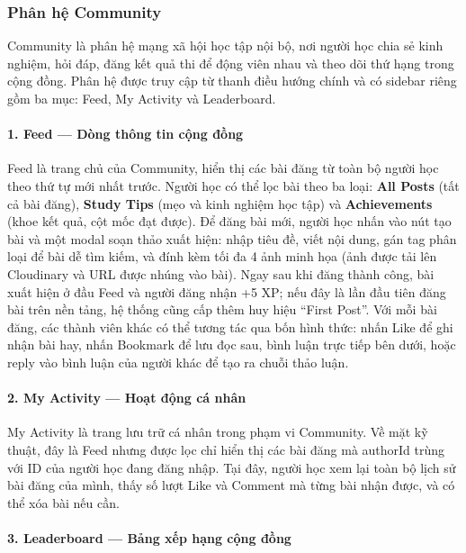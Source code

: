 \subsubsection{Phân hệ Community}

Community là phân hệ mạng xã hội học tập nội bộ, nơi người học chia sẻ kinh nghiệm, hỏi đáp, đăng kết quả thi để động viên nhau và theo dõi thứ hạng trong cộng đồng. Phân hệ được truy cập từ thanh điều hướng chính và có sidebar riêng gồm ba mục: Feed, My Activity và Leaderboard.

\paragraph{1. Feed --- Dòng thông tin cộng đồng}

Feed là trang chủ của Community, hiển thị các bài đăng từ toàn bộ người học theo thứ tự mới nhất trước. Người học có thể lọc bài theo ba loại: \textbf{All Posts} (tất cả bài đăng), \textbf{Study Tips} (mẹo và kinh nghiệm học tập) và \textbf{Achievements} (khoe kết quả, cột mốc đạt được). Để đăng bài mới, người học nhấn vào nút tạo bài và một modal soạn thảo xuất hiện: nhập tiêu đề, viết nội dung, gán tag phân loại để bài dễ tìm kiếm, và đính kèm tối đa 4 ảnh minh họa (ảnh được tải lên Cloudinary và URL được nhúng vào bài). Ngay sau khi đăng thành công, bài xuất hiện ở đầu Feed và người đăng nhận +5 XP; nếu đây là lần đầu tiên đăng bài trên nền tảng, hệ thống cũng cấp thêm huy hiệu ``First Post''. Với mỗi bài đăng, các thành viên khác có thể tương tác qua bốn hình thức: nhấn Like để ghi nhận bài hay, nhấn Bookmark để lưu đọc sau, bình luận trực tiếp bên dưới, hoặc reply vào bình luận của người khác để tạo ra chuỗi thảo luận.

\paragraph{2. My Activity --- Hoạt động cá nhân}

My Activity là trang lưu trữ cá nhân trong phạm vi Community. Về mặt kỹ thuật, đây là Feed nhưng được lọc chỉ hiển thị các bài đăng mà authorId trùng với ID của người học đang đăng nhập. Tại đây, người học xem lại toàn bộ lịch sử bài đăng của mình, thấy số lượt Like và Comment mà từng bài nhận được, và có thể xóa bài nếu cần.

\paragraph{3. Leaderboard --- Bảng xếp hạng cộng đồng}

